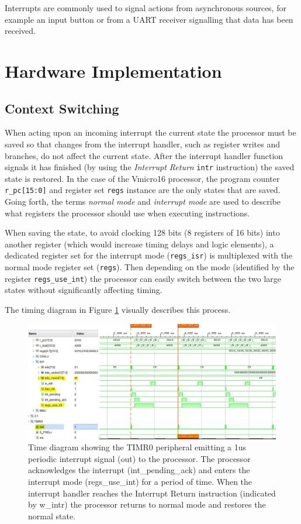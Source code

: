 \documentclass[11pt,a4paper]{report}
\begin{document}
{Interrupts are commonly used to signal actions from asynchronous sources, for example an input button or from a UART receiver signalling that data has been received.

\section{Hardware Implementation}

\subsection{Context Switching}
When acting upon an incoming interrupt the current state the processor must be saved so that changes from the interrupt handler, such as register writes and branches, do not affect the current state. After the interrupt handler function signals it has finished (by using the \textit{Interrupt Return} \verb|intr| instruction) the saved state is restored.
In the case of the Vmicro16 processor, the program counter \verb|r_pc[15:0]| and register set \verb|regs| instance are the only states that are saved. Going forth, the terms \textit{normal mode} and \textit{interrupt mode} are used to describe what registers the processor should use when executing instructions.

When saving the state, to avoid clocking 128 bits (8 registers of 16 bits) into another register (which would increase timing delays and logic elements), a dedicated register set for the interrupt mode (\verb|regs_isr|) is multiplexed with the normal mode register set (\verb|regs|). Then depending on the mode (identified by the register \verb|regs_use_int|) the processor can easily switch between the two large states without significantly affecting timing.

The timing diagram in Figure \ref{fig:interrupts} visually describes this process.

\begin{figure}[h]
\centering
\includegraphics[width=\textwidth]{interrupts}
\caption{Time diagram showing the TIMR0 peripheral emitting a 1us periodic interrupt signal (out) to the processor. The processor acknowledges the interrupt (int\_pending\_ack) and enters the interrupt mode (regs\_use\_int) for a period of time. When the interrupt handler reaches the Interrupt Return instruction (indicated by w\_intr) the processor returns to normal mode and restores the normal state.}
\label{fig:interrupts}
\end{figure}

}
\end{document}
